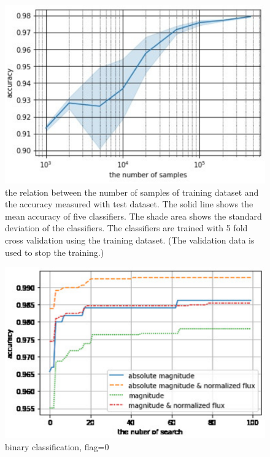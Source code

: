 \documentclass[useamsfonts]{pasj01}
\begin{document}
\begin{figure}[ht]
  \begin{center}
     \includegraphics[width=\columnwidth]{figures/size_accuracy.eps}
  \end{center}
  \caption{%
  the relation between the number of samples of training dataset and the accuracy measured with test dataset. The solid line shows the mean accuracy of five classifiers. The shade area shows the standard deviation of the classifiers. The classifiers are trained with 5 fold cross validation using the training dataset. (The validation data is used to stop the training.)
  }%
  \label{fig:size_convergence_test}
\end{figure}
\begin{figure}[ht]
  \begin{center}
     \includegraphics[width=\columnwidth]{figures/hp_iterations_accuracy.eps}
  \end{center}
  \caption{%
  binary classification, flag=0
  }%
  \label{fig:size_convergence_test}
\end{figure}
%
\end{document}
